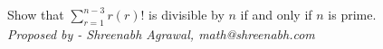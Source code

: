 \documentclass{article}
\begin{document}
\centering
Show that $\sum\limits_{r=1}^{n-3} r(r) !$ is divisible by $n$ if and only if $n$ is prime.
\\
\color{blue}
\textit{Proposed by - Shreenabh Agrawal, math@shreenabh.com}
\end{document}
